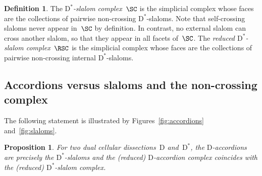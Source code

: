 \documentclass{amsart}
\newtheorem{proposition}[theorem]{Proposition}
\theoremstyle{definition}
\newtheorem{definition}[theorem]{Definition}
\newcommand{\darkblue}{\color{darkblue}} %
\newcommand{\defn}[1]{\textsl{\darkblue #1}} %
\newcommand{\dual}{^*} %
\newcommand{\dissection}{\mathrm{D}} %
\begin{document}
\begin{definition}
\label{def:slalomComplex}
The \defn{$\dissection\dual$-slalom complex}~$\SC$ is the simplicial complex whose faces are the collections of pairwise non-crossing $\dissection\dual$-slaloms.
Note that self-crossing slaloms never appear in~$\SC$ by definition.
In contrast, no external slalom can cross another slalom, so that they appear in all facets of~$\SC$. 
The \defn{reduced $\dissection\dual$-slalom complex}~$\RSC$ is the simplicial complex whose faces are the collections of pairwise non-crossing internal $\dissection\dual$-slaloms.
\end{definition}

\subsection{Accordions versus slaloms and the non-crossing complex}
\label{subsec:accordionsVSSlaloms}

The following statement is illustrated by Figures~\ref{fig:accordions} and~\ref{fig:slaloms}.

\begin{proposition}
\label{prop:accordionsSlaloms}
For two dual cellular dissections~$\dissection$ and~$\dissection\dual$, the $\dissection$-accordions are precisely the $\dissection\dual$-slaloms and the (reduced) $\dissection$-accordion complex coincides with the (reduced) $\dissection\dual$-slalom complex.
\end{proposition}
\end{document}
